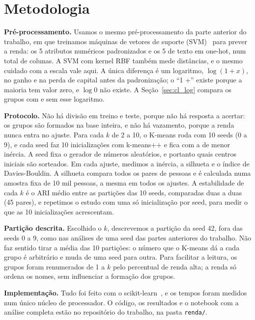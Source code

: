 \section{Metodologia}\label{sec:km_metodo}

\textbf{Pré-processamento.} Usamos o mesmo pré-processamento da parte anterior do trabalho, em que treinamos máquinas de vetores de suporte (SVM)~\cite{cortes:95} para prever a renda: os 5 atributos numéricos padronizados e os 5 de texto em one-hot, num total de \clColunas{} colunas. A SVM com kernel RBF também mede distâncias, e o mesmo cuidado com a escala vale aqui. A única diferença é um logaritmo, $\log(1 + x)$, no ganho e na perda de capital antes da padronização; o ``1 +'' existe porque a maioria tem valor zero, e $\log 0$ não existe. A Seção~\ref{sec:cl_log} compara os grupos com e sem esse logaritmo.

\textbf{Protocolo.} Não há divisão em treino e teste, porque não há resposta a acertar: os grupos são formados na base inteira, e não há vazamento, porque a renda nunca entra no ajuste. Para cada $k$ de 2 a 10, o K-means roda com 10 seeds (0 a 9), e cada seed faz 10 inicializações com k-means++ e fica com a de menor inércia. A seed fixa o gerador de números aleatórios, e portanto quais centros iniciais são sorteados. Em cada ajuste, medimos a inércia, a silhueta e o índice de Davies-Bouldin. A silhueta compara todos os pares de pessoas e é calculada numa amostra fixa de 10 mil pessoas, a mesma em todos os ajustes. A estabilidade de cada $k$ é o ARI médio entre as partições das 10 seeds, comparadas duas a duas (45 pares), e repetimos o estudo com uma só inicialização por seed, para medir o que as 10 inicializações acrescentam.

\textbf{Partição descrita.} Escolhido o $k$, descrevemos a partição da seed 42, fora das seeds 0 a 9, como nas análises de uma seed das partes anteriores do trabalho. Não faz sentido tirar a média das 10 partições: o número que o K-means dá a cada grupo é arbitrário e muda de uma seed para outra. Para facilitar a leitura, os grupos foram renumerados de 1 a $k$ pelo percentual de renda alta; a renda só ordena os nomes, sem influenciar a formação dos grupos.

\textbf{Implementação.} Tudo foi feito com o scikit-learn~\cite{pedregosa:11}, e os tempos foram medidos num único núcleo de processador. O código, os resultados e o notebook com a análise completa estão no repositório do trabalho, na pasta \texttt{renda/}.
